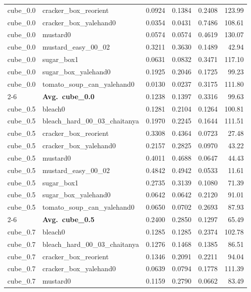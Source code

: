 \begin{longtable}{llrrrr}
  cube_0.0 & cracker\_box\_reorient & 0.0924 & 0.1384 & 0.2408 & 123.99 \\
  cube_0.0 & cracker\_box\_yalehand0 & 0.0354 & 0.0431 & 0.7486 & 108.61 \\
  cube_0.0 & mustard0 & 0.0574 & 0.0574 & 0.4619 & 130.07 \\
  cube_0.0 & mustard\_easy\_00\_02 & 0.3211 & 0.3630 & 0.1489 & 42.94 \\
  cube_0.0 & sugar\_box1 & 0.0631 & 0.0832 & 0.3471 & 117.10 \\
  cube_0.0 & sugar\_box\_yalehand0 & 0.1925 & 0.2046 & 0.1725 & 99.23 \\
  cube_0.0 & tomato\_soup\_can\_yalehand0 & 0.0130 & 0.0237 & 0.3175 & 111.80 \\
  \cmidrule{2-6}
  & \textbf{Avg.~cube_0.0} & 0.1238 & 0.1397 & 0.3316 & 99.63 \\
  \midrule
  cube_0.5 & bleach0 & 0.1281 & 0.2104 & 0.1264 & 100.81 \\
  cube_0.5 & bleach\_hard\_00\_03\_chaitanya & 0.1970 & 0.2245 & 0.1644 & 111.51 \\
  cube_0.5 & cracker\_box\_reorient & 0.3308 & 0.4364 & 0.0723 & 27.48 \\
  cube_0.5 & cracker\_box\_yalehand0 & 0.2157 & 0.2825 & 0.0970 & 43.22 \\
  cube_0.5 & mustard0 & 0.4011 & 0.4688 & 0.0647 & 44.43 \\
  cube_0.5 & mustard\_easy\_00\_02 & 0.4842 & 0.4942 & 0.0533 & 11.61 \\
  cube_0.5 & sugar\_box1 & 0.2735 & 0.3139 & 0.1080 & 71.39 \\
  cube_0.5 & sugar\_box\_yalehand0 & 0.0642 & 0.0642 & 0.2120 & 91.01 \\
  cube_0.5 & tomato\_soup\_can\_yalehand0 & 0.0650 & 0.0702 & 0.2693 & 87.93 \\
  \cmidrule{2-6}
  & \textbf{Avg.~cube_0.5} & 0.2400 & 0.2850 & 0.1297 & 65.49 \\
  \midrule
  cube_0.7 & bleach0 & 0.1285 & 0.1285 & 0.2374 & 102.78 \\
  cube_0.7 & bleach\_hard\_00\_03\_chaitanya & 0.1276 & 0.1468 & 0.1385 & 86.51 \\
  cube_0.7 & cracker\_box\_reorient & 0.1346 & 0.2091 & 0.2211 & 94.04 \\
  cube_0.7 & cracker\_box\_yalehand0 & 0.0639 & 0.0794 & 0.1778 & 111.39 \\
  cube_0.7 & mustard0 & 0.1159 & 0.2790 & 0.0662 & 83.49 \\

\end{longtable}
